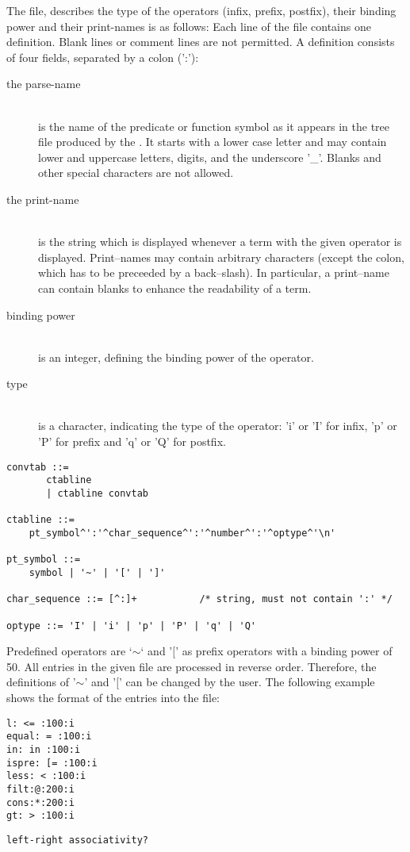 The file, describes the type of the operators
(infix,  prefix,  postfix),  their  binding  power and their
print-names is as follows: Each line of  the  file  contains
one definition. Blank lines or comment lines are not permitted. 
A definition consists of four fields,  separated  by  a colon (':'):
      \begin{description}
      \item[the parse-name]
           {\ \\
            is the name of the predicate or function symbol  as  it
            appears  in  the  tree file produced by the \SAM.  It
            starts with a lower case letter and may  contain  lower
            and  uppercase letters, digits, and the underscore '\_'.
            Blanks and other special characters are not allowed.}
      \item[the print-name]
           {\ \\
            is the string which is displayed whenever a  term  with
            the  given  operator is displayed. Print--names may
            contain arbitrary characters (except the colon, which  has
            to  be  preceeded  by  a back--slash).  In particular, a
            print--name can contain blanks to enhance the  readability
            of a term.}
      \item[binding power]
           {\ \\
            is an integer, defining the binding power of the operator.}
      \item[type]
           {\ \\
            is a character, indicating the type  of  the  operator:
            'i'  or 'I' for infix, 'p' or 'P' for prefix and 'q' or
            'Q' for postfix.}
      \end{description}

\begin{verbatim}
convtab ::=
       ctabline
       | ctabline convtab

ctabline ::=
    pt_symbol^':'^char_sequence^':'^number^':'^optype^'\n'

pt_symbol ::=
	symbol | '~' | '[' | ']'

char_sequence ::= [^:]+           /* string, must not contain ':' */

optype ::= 'I' | 'i' | 'p' | 'P' | 'q' | 'Q'
\end{verbatim}

      Predefined operators are `$\sim$` and '$[$' as prefix operators with a
      binding power of 50. All entries in the given file are processed
      in reverse order.  Therefore, the definitions of '$\sim$' and '$[$'
      can be changed by the user.  The following example shows the
      format of the entries into the file:

\begin{verbatim}
l: <= :100:i
equal: = :100:i
in: in :100:i
ispre: [= :100:i
less: < :100:i
filt:@:200:i
cons:*:200:i
gt: > :100:i
\end{verbatim}


	{\tt left-right associativity?}
